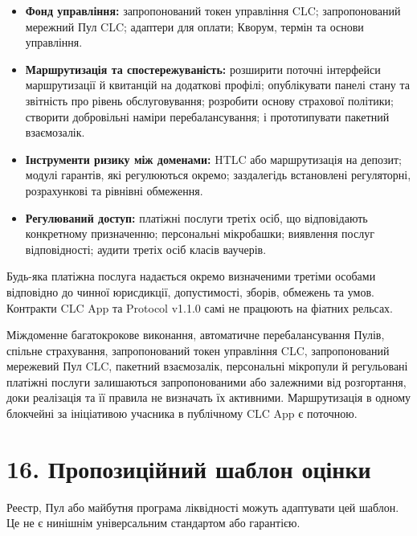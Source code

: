 \documentclass[11pt]{article}
\begin{document}
\begin{itemize}[leftmargin=*]
\item \textbf{Фонд управління:} запропонований токен управління CLC; запропонований мережний Пул CLC; адаптери для оплати; Кворум, термін та основи управління.
\item \textbf{Маршрутизація та спостережуваність:} розширити поточні інтерфейси маршрутизації й квитанцій на додаткові профілі; опублікувати панелі стану та звітність про рівень обслуговування; розробити основу страхової політики; створити добровільні наміри перебалансування; і прототипувати пакетний взаємозалік.
\item \textbf{Інструменти ризику між доменами:} HTLC або маршрутизація на депозит; модулі гарантів, які регулюються окремо; заздалегідь встановлені регуляторні, розрахункові та рівнівні обмеження.
\item \textbf{Регулюваний доступ:} платіжні послуги третіх осіб, що відповідають конкретному призначенню; персональні мікробашки; виявлення послуг відповідності; аудити третіх осіб класів ваучерів.
\end{itemize}
Будь-яка платіжна послуга надається окремо визначеними третіми особами відповідно до чинної юрисдикції, допустимості, зборів, обмежень та умов. Контракти CLC App та Protocol v1.1.0 самі не працюють на фіатних рельсах.

Міждоменне багатокрокове виконання, автоматичне перебалансування Пулів, спільне страхування, запропонований токен управління CLC, запропонований мережевий Пул CLC, пакетний взаємозалік, персональні мікропули й регульовані платіжні послуги залишаються запропонованими або залежними від розгортання, доки реалізація та її правила не визначать їх активними. Маршрутизація в одному блокчейні за ініціативою учасника в публічному CLC App є поточною.


\section*{16. Пропозиційний шаблон оцінки}

Реестр, Пул або майбутня програма ліквідності можуть адаптувати цей шаблон. Це не є нинішнім універсальним стандартом або гарантією.
\end{document}
